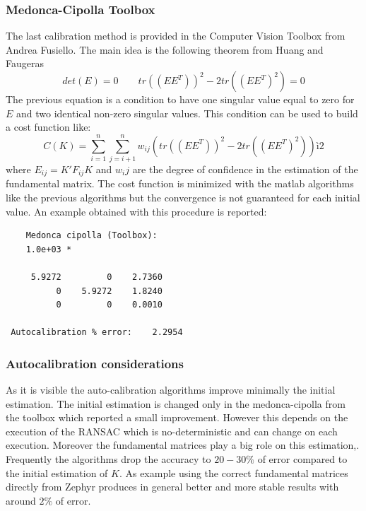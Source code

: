 \documentclass[12pt]{article}
\begin{document}
\subsubsection{Medonca-Cipolla Toolbox}
The last calibration method is provided in the Computer Vision Toolbox from Andrea Fusiello. The main idea is the following theorem from Huang and Faugeras \cite{Faugeras89}
\begin{equation}
    det(E) = 0 \qquad tr((EE^T))^2 - 2 tr((EE^T)^2) = 0
\end{equation}
The previous equation is a condition to have one singular value equal to zero for $E$ and two identical non-zero singular values. This condition can be used to build a cost function like:
\begin{equation}
    C(K) = \sum_{i=1}^{n} \sum_{j=i+1}^{n} w_{ij} (tr((EE^T))^2 - 2 tr((EE^T)^2))ì2
\end{equation}
where $E_{ij} = K'F_{ij}K$ and $w_ij$ are the degree of confidence in the estimation of the fundamental matrix. The cost function is minimized with the matlab algorithms like the previous algorithms but the convergence is not guaranteed for each initial value. An example obtained with this procedure is reported:
\begin{verbatim}
    Medonca cipolla (Toolbox): 
    1.0e+03 *
 
     5.9272         0    2.7360
          0    5.9272    1.8240
          0         0    0.0010
 
 Autocalibration % error:	 2.2954  
\end{verbatim}
\newpage

\subsubsection{Autocalibration considerations}
As it is visible the auto-calibration algorithms improve minimally the initial estimation. The initial estimation is changed only in the medonca-cipolla from the toolbox which reported a small improvement. However this depends on the execution of the RANSAC which is no-deterministic and can change on each execution. Moreover the fundamental matrices play a big role on this estimation,. Frequently the algorithms drop the accuracy to $20-30\%$ of error compared to the initial estimation of $K$. As example using the correct fundamental matrices directly from Zephyr produces in general better and more stable results with around $2\%$ of error. 
\end{document}
